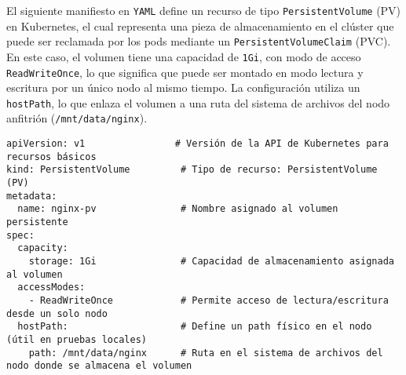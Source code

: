 El siguiente manifiesto en \texttt{YAML} define un recurso de tipo \texttt{PersistentVolume} (PV) en Kubernetes, 
el cual representa una pieza de almacenamiento en el clúster que puede ser reclamada por los pods mediante 
un \texttt{PersistentVolumeClaim} (PVC). En este caso, el volumen tiene una capacidad de \texttt{1Gi}, con 
modo de acceso \texttt{ReadWriteOnce}, lo que significa que puede ser montado en modo lectura y escritura por 
un único nodo al mismo tiempo. La configuración utiliza un \texttt{hostPath}, lo que enlaza el volumen a una 
ruta del sistema de archivos del nodo anfitrión (\texttt{/mnt/data/nginx}).

\begin{verbatim}
apiVersion: v1                # Versión de la API de Kubernetes para recursos básicos
kind: PersistentVolume         # Tipo de recurso: PersistentVolume (PV)
metadata:
  name: nginx-pv               # Nombre asignado al volumen persistente
spec:
  capacity:
    storage: 1Gi               # Capacidad de almacenamiento asignada al volumen
  accessModes:
    - ReadWriteOnce            # Permite acceso de lectura/escritura desde un solo nodo
  hostPath:                    # Define un path físico en el nodo (útil en pruebas locales)
    path: /mnt/data/nginx      # Ruta en el sistema de archivos del nodo donde se almacena el volumen
\end{verbatim}